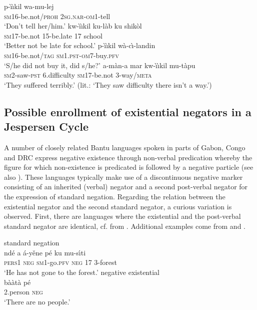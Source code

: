 \documentclass[output=paper,draft,draftmode,colorlinks,citecolor=brown]{langscibook}
\begin{document}
\ea\label{ex:ruwund-tell}
\gll p-{\`\i}{\`\i}kil wa-mu-lej\\
\textsc{sm}16-be.not/\textsc{proh} 2\textsc{sg.nar}-\textsc{om}1-tell\\
\glt 	`Don’t tell her/him.'
%
\ex\label{ex:ruwund-late}
\gll kw-{\`\i}{\`\i}kil ku-l{\`a}b ku
shik{\`o}l\\ \textsc{sm}17-be.not 15-be.late 17 school\\
\glt 	`Better not
be late for school.'
%
\ex\label{ex:ruwund-buy}
\gll p-{\`\i}{\`\i}kil w{\`a}-c{\`\i}-landin\\
\textsc{sm}16-be.not/\textsc{tag} \textsc{sm1.pst-om}7-buy.\textsc{pfv}\\
\glt 	`S/he did not buy it, did s/he?'
%
\ex\label{ex:ruwund-suffer}
\gll a-m{\`a}n-a mar kw-{\`\i}{\`\i}kil
mu-t{\`a}pu\\ \textsc{sm}2-saw-\textsc{pst} 6.difficulty
\textsc{sm}17-be.not 3-way/\textsc{meta}\\
\glt 	`They suffered
terribly.' (lit.: `They saw difficulty there isn't a way.')
\z
\z

%

\subsection{Possible enrollment of existential negators in a Jespersen Cycle}\label{sec:1:6.3}
%
A number of closely related Bantu languages spoken in parts of Gabon, Congo and DRC express negative existence through non-verbal predication whereby the figure for which non-existence is predicated is followed by a negative particle (see also ). These languages typically make use of a discontinuous negative marker consisting of an inherited (verbal) negator and a second post-verbal negator for the expression of standard negation. Regarding the relation between the existential negator and the second standard negator, a curious variation is observed. First, there are languages where the existential and the post-verbal standard negator are identical, cf.  from . Additional examples come from   and  .
%

\ea\label{ex:iyaa-forest-people}
%

\ea standard negation\\
\gll ndé a á-yěne pé ku mu-s{\'\i}ti\\
	\textsc{pers}1 \textsc{neg} \textsc{sm}1-go.\textsc{pfv} \textsc{neg} 17 3-forest\\
\glt 	`He has not gone to the forest.'
\ex negative existential\\
\gll b{\`a\`a}t\`a pé\\
	2.person \textsc{neg}\\
\glt 	`There are no people.'
\z
\z
\end{document}

